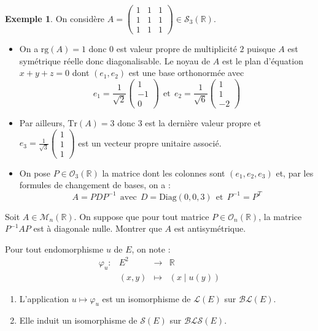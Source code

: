 \documentclass[french]{article}
\newcommand{\R}{\mathbb{R}}
\newcommand{\inv}{^{-1}}
\newcommand{\Tr}{\text{Tr}}
\theoremstyle{plain}
\theoremstyle{definition}
\newtheorem*{ex}{Exemple}
\theoremstyle{remark}
\begin{document}
\begin{ex}
	On considère $A=\displaystyle\begin{pmatrix}
		1&1&1\\
		1&1&1\\
		1&1&1
	\end{pmatrix}\in\mathcal{S}_3(\R)$.
	\begin{itemize}
		\item On a $\text{rg}(A)=1$ donc $0$ est valeur propre de multiplicité $2$ puisque $A$ est symétrique réelle donc diagonalisable. Le noyau de $A$ est le plan d'équation $x+y+z=0$ dont $(e_1,e_2)$ est une base orthonormée avec $$e_1=\frac{1}{\sqrt{2}}\begin{pmatrix}
			1\\
			-1\\
			0
		\end{pmatrix}\ \ \text{et}\ \ e_2=\frac{1}{\sqrt{6}}\begin{pmatrix}
		1\\
		1\\
		-2
		\end{pmatrix}$$
		\item Par ailleurs, $\Tr(A)=3$ donc $3$ est la dernière valeur propre et $e_3=\displaystyle\frac{1}{\sqrt{3}}\begin{pmatrix}
			1\\
			1\\
			1
		\end{pmatrix}$ est un vecteur propre unitaire associé.
		\item On pose $P\in\mathcal{O}_3(\R)$ la matrice dont les colonnes sont $(e_1,e_2,e_3)$ et, par les formules de changement de bases, on a : $$A=PDP\inv\ \ \text{avec}\ \ D=\text{Diag}(0,0,3)\ \ \text{et}\ \ P\inv=P^T$$
	\end{itemize}
\end{ex}

\begin{exo}
	Soit $A\in\mathcal{M}_n(\R)$. On suppose que pour tout matrice $P\in\mathcal{O}_n(\R)$, la matrice $P\inv AP$ est à diagonale nulle. Montrer que $A$ est antisymétrique.
\end{exo}

\begin{thm}
	Pour tout endomorphisme $u$ de $E$, on note : $$\begin{array}{lrcl}
		\varphi_u:&E^2&\longrightarrow&\R \\
		&(x,y)&\longmapsto&(x\mid u(y))
	\end{array}$$
	\begin{enumerate}
		\item L'application $u\mapsto\varphi_u$ est un isomorphisme de $\mathcal{L}(E)$ sur $\mathcal{BL}(E)$.
		\item Elle induit un isomorphisme de $\mathcal{S}(E)$ sur $\mathcal{BLS}(E)$.
	\end{enumerate}
\end{thm}
\end{document}
